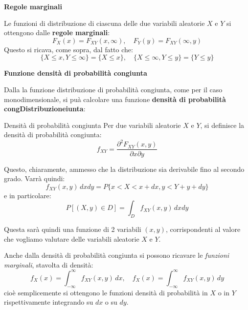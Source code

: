 \documentclass[a4paper,11pt]{article}
\begin{document}
\par\smallskip

\noindent
\textbf{\textsf{Regole marginali}}

\noindent
Le funzioni di distribuzione di ciascuna delle due variabili aleatorie $X$ e $Y$ si ottengono dalle \textbf{regole marginali}:
$$
F_X(x) = F_{XY}(x, \infty), \quad F_Y(y) = F_{XY}(\infty, y)
$$
Questo si ricava, come sopra, dal fatto che:
$$
\{X \leq x, Y \leq \infty\} = \{X \leq x\}, \quad \{X \leq \infty, Y \leq y\} = \{Y \leq y\}
$$

\par\smallskip

\noindent
\textbf{\textsf{Funzione densità di probabilità congiunta}}

\noindent
Dalla la funzione distribuzione di probabilità congiunta, come per il caso monodimensionale, si puà calcolare una funzione \textbf{densità di probabilità congDistribuzioneiunta}: 
\begin{definition}{Densità di probabilità congiunta}
Per due variabili aleatorie $X$ e $Y$, si definisce la densità di probabilità congiunta:
$$
f_{XY} = \frac{\partial^2 F_{XY}(x, y)}{\partial x \partial y}
$$
\end{definition}
Questo, chiaramente, ammesso che la distribuzione sia derivabile fino al secondo grado. Varrà quindi:
$$
f_{XY} (x, y) \, dx dy = P \{ x < X < x + dx, y < Y + y + dy \}
$$
e in particolare:
$$
P[(X, y) \in D] = \int_D f_{XY} (x, y) \, dx dy
$$

Questa sarà quindi una funzione di 2 variabili $(x, y)$, corrispondenti al valore che vogliamo valutare delle variabili aleatorie $X$ e $Y$.

Anche dalla densità di probabilità congiunta si possono ricavare le \textit{funzioni marginali}, stavolta di densità:
$$
f_X(x) = \int_{-\infty}^\infty f_{XY} (x, y) \, dx, \quad
f_X(x) = \int_{-\infty}^\infty f_{XY} (x, y) \, dy
$$
cioè semplicemente si ottengono le funzioni densità di probabilità in $X$ o in $Y$ rispettivamente integrando su $dx$ o su $dy$. 
\end{document}
